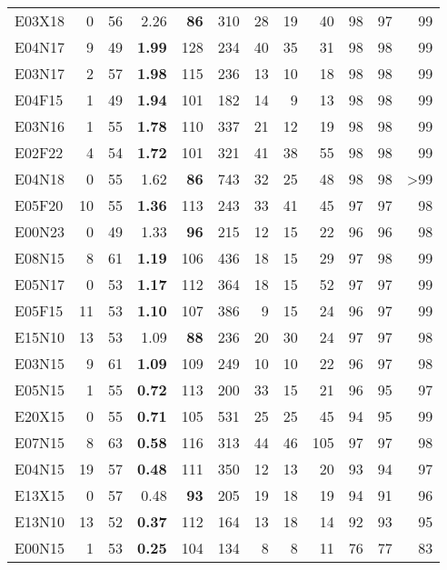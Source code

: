 \documentclass[ppgc,tese,english,formais,babel]{iiufrgs}
\newcommand{\bestcolumnemph}[1]{\textbf{#1}}
\begin{document}
\begin{table}[!ht]
\begin{center}
\begin{tabular}{lrrrrrrrrrrr}
E03X18 & 0 & 56 & 2.26 & \bestcolumnemph{86} & 310 & 28 & 19 & 40 & 98 & 97 & 99 \\
E04N17 & 9 & 49 & \bestcolumnemph{1.99} & 128 & 234 & 40 & 35 & 31 & 98 & 98 & 99 \\
E03N17 & 2 & 57 & \bestcolumnemph{1.98} & 115 & 236 & 13 & 10 & 18 & 98 & 98 & 99 \\
E04F15 & 1 & 49 & \bestcolumnemph{1.94} & 101 & 182 & 14 & 9 & 13 & 98 & 98 & 99 \\
E03N16 & 1 & 55 & \bestcolumnemph{1.78} & 110 & 337 & 21 & 12 & 19 & 98 & 98 & 99 \\
E02F22 & 4 & 54 & \bestcolumnemph{1.72} & 101 & 321 & 41 & 38 & 55 & 98 & 98 & 99 \\
E04N18 & 0 & 55 & 1.62 & \bestcolumnemph{86} & 743 & 32 & 25 & 48 & 98 & 98 & >99 \\
E05F20 & 10 & 55 & \bestcolumnemph{1.36} & 113 & 243 & 33 & 41 & 45 & 97 & 97 & 98 \\
E00N23 & 0 & 49 & 1.33 & \bestcolumnemph{96} & 215 & 12 & 15 & 22 & 96 & 96 & 98 \\
E08N15 & 8 & 61 & \bestcolumnemph{1.19} & 106 & 436 & 18 & 15 & 29 & 97 & 98 & 99 \\
E05N17 & 0 & 53 & \bestcolumnemph{1.17} & 112 & 364 & 18 & 15 & 52 & 97 & 97 & 99 \\
E05F15 & 11 & 53 & \bestcolumnemph{1.10} & 107 & 386 & 9 & 15 & 24 & 96 & 97 & 99 \\
E15N10 & 13 & 53 & 1.09 & \bestcolumnemph{88} & 236 & 20 & 30 & 24 & 97 & 97 & 98 \\
E03N15 & 9 & 61 & \bestcolumnemph{1.09} & 109 & 249 & 10 & 10 & 22 & 96 & 97 & 98 \\
E05N15 & 1 & 55 & \bestcolumnemph{0.72} & 113 & 200 & 33 & 15 & 21 & 96 & 95 & 97 \\
E20X15 & 0 & 55 & \bestcolumnemph{0.71} & 105 & 531 & 25 & 25 & 45 & 94 & 95 & 99 \\
E07N15 & 8 & 63 & \bestcolumnemph{0.58} & 116 & 313 & 44 & 46 & 105 & 97 & 97 & 98 \\
E04N15 & 19 & 57 & \bestcolumnemph{0.48} & 111 & 350 & 12 & 13 & 20 & 93 & 94 & 97 \\
E13X15 & 0 & 57 & 0.48 & \bestcolumnemph{93} & 205 & 19 & 18 & 19 & 94 & 91 & 96 \\
E13N10 & 13 & 52 & \bestcolumnemph{0.37} & 112 & 164 & 13 & 18 & 14 & 92 & 93 & 95 \\
E00N15 & 1 & 53 & \bestcolumnemph{0.25} & 104 & 134 & 8 & 8 & 11 & 76 & 77 & 83 \\

\end{tabular}
\end{center}
\end{table}
\end{document}

